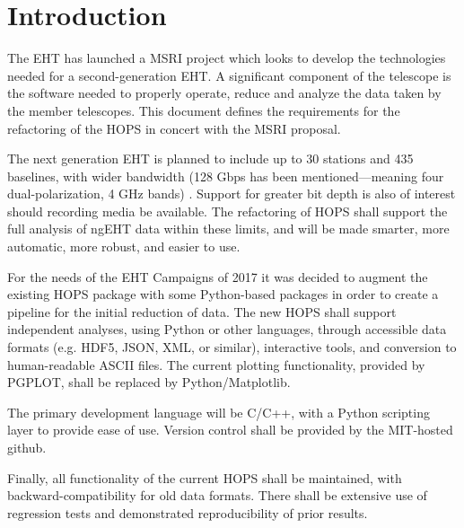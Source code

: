 %
%

\section{Introduction}
\label{sec:intro}

The \ac{EHT} has launched a \ac{MSRI} project which looks to develop
the technologies needed for a second-generation \acs{EHT}. 
A significant component of the telescope is the software needed to 
properly operate, reduce and analyze the data taken by the member telescopes.
This document defines the requirements for the refactoring of the \ac{HOPS} in 
concert with the \acs{MSRI} proposal. 

The next generation \acs{EHT} is planned to include up to 30 stations and 
435 baselines, with wider bandwidth (128 Gbps has been mentioned---meaning 
four dual-polarization, 4 GHz bands) \TBR{}.  Support for greater bit depth is also of 
interest should recording media be available.  The refactoring
of \ac{HOPS} shall support the full analysis of ngEHT data within these limits,
and will be made smarter, more automatic, more robust, and easier to use.


For the needs of the \acs{EHT} Campaigns of 2017 it was decided to augment
the existing HOPS package with some Python-based packages in order to
create a pipeline for the initial reduction of data. The new \ac{HOPS} shall
support independent analyses, using Python or other languages, through
accessible data formats (e.g. HDF5, JSON, XML, or similar), interactive tools, and 
conversion to human-readable ASCII files. The current plotting functionality,
provided by PGPLOT, shall be replaced by Python/Matplotlib.


The primary development language will be C/C++, with a Python scripting layer
to provide ease of use. Version control shall be provided by the MIT-hosted github.

Finally, all functionality of the current \acs{HOPS} shall be maintained, with
backward-compatibility for old data formats. There shall be extensive use of regression
tests and demonstrated reproducibility of prior results.

